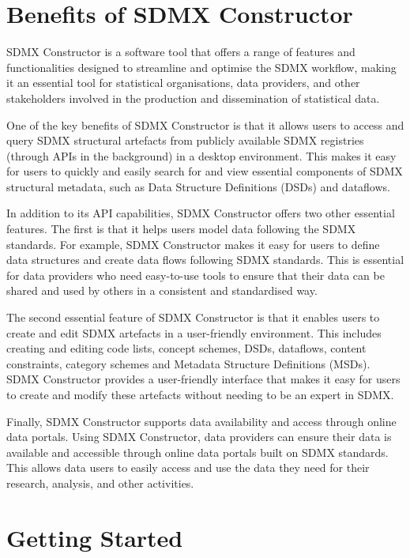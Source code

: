 \documentclass[
]{book}
\begin{document}
\hypertarget{benefits-of}{%
\chapter{Benefits of SDMX Constructor}\label{benefits-of}}

SDMX Constructor is a software tool that offers a range of features and functionalities designed to streamline and optimise the SDMX workflow, making it an essential tool for statistical organisations, data providers, and other stakeholders involved in the production and dissemination of statistical data.

One of the key benefits of SDMX Constructor is that it allows users to access and query SDMX structural artefacts from publicly available SDMX registries (through APIs in the background) in a desktop environment. This makes it easy for users to quickly and easily search for and view essential components of SDMX structural metadata, such as Data Structure Definitions (DSDs) and dataflows.

In addition to its API capabilities, SDMX Constructor offers two other essential features. The first is that it helps users model data following the SDMX standards. For example, SDMX Constructor makes it easy for users to define data structures and create data flows following SDMX standards. This is essential for data providers who need easy-to-use tools to ensure that their data can be shared and used by others in a consistent and standardised way.

The second essential feature of SDMX Constructor is that it enables users to create and edit SDMX artefacts in a user-friendly environment. This includes creating and editing code lists, concept schemes, DSDs, dataflows, content constraints, category schemes and Metadata Structure Definitions (MSDs). SDMX Constructor provides a user-friendly interface that makes it easy for users to create and modify these artefacts without needing to be an expert in SDMX.

Finally, SDMX Constructor supports data availability and access through online data portals. Using SDMX Constructor, data providers can ensure their data is available and accessible through online data portals built on SDMX standards. This allows data users to easily access and use the data they need for their research, analysis, and other activities.

\hypertarget{getting-started}{%
\chapter{Getting Started}\label{getting-started}}
\end{document}
